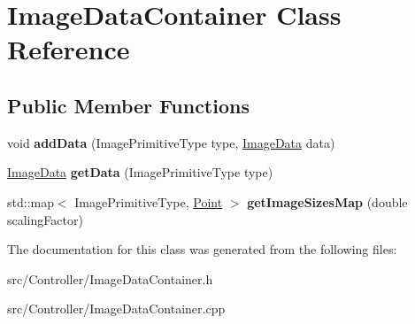 \hypertarget{classImageDataContainer}{}\section{Image\+Data\+Container Class Reference}
\label{classImageDataContainer}
\subsection*{Public Member Functions}
\begin{DoxyCompactItemize}
\item 
void {\bfseries add\+Data} (Image\+Primitive\+Type type, \hyperlink{structImageData}{Image\+Data} data)\hypertarget{classImageDataContainer_ae2669ff38a90086bf00521cbe0ad5d14}{}\label{classImageDataContainer_ae2669ff38a90086bf00521cbe0ad5d14}

\item 
\hyperlink{structImageData}{Image\+Data} {\bfseries get\+Data} (Image\+Primitive\+Type type)\hypertarget{classImageDataContainer_a7ded5b1de74d09b4d0256f38a085cdc5}{}\label{classImageDataContainer_a7ded5b1de74d09b4d0256f38a085cdc5}

\item 
std\+::map$<$ Image\+Primitive\+Type, \hyperlink{classPoint}{Point} $>$ {\bfseries get\+Image\+Sizes\+Map} (double scaling\+Factor)\hypertarget{classImageDataContainer_a2ced17bbba9e5864ad621d74fdce3b2a}{}\label{classImageDataContainer_a2ced17bbba9e5864ad621d74fdce3b2a}

\end{DoxyCompactItemize}


The documentation for this class was generated from the following files\+:\begin{DoxyCompactItemize}
\item 
src/\+Controller/Image\+Data\+Container.\+h\item 
src/\+Controller/Image\+Data\+Container.\+cpp\end{DoxyCompactItemize}
